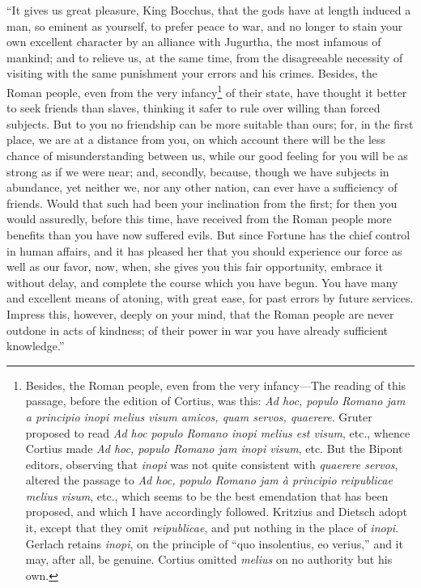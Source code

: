 ``It gives us great pleasure, King Bocchus, that the gods have at
length induced a man, so eminent as yourself, to prefer peace to war,
and no longer to stain your own excellent character by an alliance
with Jugurtha, the most infamous of mankind; and to relieve us, at the
same time, from the disagreeable necessity of visiting with the same
punishment your errors and his crimes. Besides, the Roman people, even
from the very infancy\footnote{Besides, the Roman people, even from the very infancy—The
reading of this passage, before the edition of Cortius, was this: \emph{Ad
hoc, populo Romano jam a principio inopi melius visum amicos, quam
servos, quaerere}. Gruter proposed to read \emph{Ad hoc populo Romano inopi
melius est visum}, etc., whence Cortius made \emph{Ad hoc, populo Romano jam
inopi visum}, etc. But the Bipont editors, observing that \emph{inopi} was
not quite consistent with \emph{quaerere servos}, altered the passage to
\emph{Ad hoc, populo Romano jam à principio reipublicae melius visum},
etc., which seems to be the best emendation that has been proposed,
and which I have accordingly followed. Kritzius and Dietsch adopt it,
except that they omit \emph{reipublicae}, and put nothing in the place of
\emph{inopi}. Gerlach retains \emph{inopi}, on the principle of ``quo
insolentius, eo verius,'' and it may, after all, be genuine. Cortius
omitted \emph{melius} on no authority but his own.} of their state, have thought it better to
seek friends than slaves, thinking it safer to rule over willing than
forced subjects. But to you no friendship can be more suitable than
ours; for, in the first place, we are at a distance from you, on which
account there will be the less chance of misunderstanding between us,
while our good feeling for you will be as strong as if we were near;
and, secondly, because, though we have subjects in abundance, yet
neither we, nor any other nation, can ever have a sufficiency of
friends. Would that such had been your inclination from the first; for
then you would assuredly, before this time, have received from the
Roman people more benefits than you have now suffered evils. But since
Fortune has the chief control in human affairs, and it has pleased her
that you should experience our force as well as our favor, now, when,
she gives you this fair opportunity, embrace it without delay, and
complete the course which you have begun. You have many and excellent
means of atoning, with great ease, for past errors by future services.
Impress this, however, deeply on your mind, that the Roman people are
never outdone in acts of kindness; of their power in war you have
already sufficient knowledge.''

